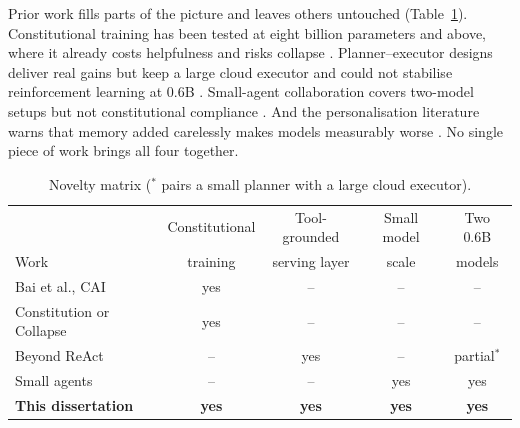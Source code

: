 Prior work fills parts of the picture and leaves others untouched (Table~\ref{tab:novelty}). Constitutional training has been tested at eight billion parameters and above, where it already costs helpfulness and risks collapse \cite{bai2022constitutionalaiharmlessnessai, zhang2025constitutioncollapseexploringconstitutional}. Planner--executor designs deliver real gains but keep a large cloud executor and could not stabilise reinforcement learning at 0.6B \cite{wei2025reactplannercentricframeworkcomplex}. Small-agent collaboration covers two-model setups but not constitutional compliance \cite{zywot2026smallagentscollaboratebeat}. And the personalisation literature warns that memory added carelessly makes models measurably worse \cite{hu2026opbenchbenchmarkingoverpersonalizationmemoryaugmented}. No single piece of work brings all four together.

\begin{table}[H]
  \centering
  \caption{Novelty matrix (${}^{*}$ pairs a small planner with a large cloud executor).}
  \label{tab:novelty}
  \begin{tabular}{lcccc}
    \hline
     & Constitutional & Tool-grounded & Small model & Two 0.6B \\
    Work & training & serving layer & scale & models \\
    \hline
    Bai et al., CAI \cite{bai2022constitutionalaiharmlessnessai} & yes & -- & -- & -- \\
    Constitution or Collapse \cite{zhang2025constitutioncollapseexploringconstitutional} & yes & -- & -- & -- \\
    Beyond ReAct \cite{wei2025reactplannercentricframeworkcomplex} & -- & yes & -- & partial${}^{*}$ \\
    Small agents \cite{zywot2026smallagentscollaboratebeat} & -- & -- & yes & yes \\
    \textbf{This dissertation} & \textbf{yes} & \textbf{yes} & \textbf{yes} & \textbf{yes} \\
    \hline
  \end{tabular}
\end{table}

